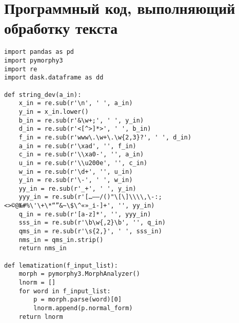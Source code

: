 \documentclass[coursework]{SCWorks}
\begin{document}
\conclusion


% 
% 

\appendix
\section{Программный код, выполняющий обработку текста}
\label{apx:tokenization}
\begin{verbatim}
import pandas as pd
import pymorphy3
import re
import dask.dataframe as dd

def string_dev(a_in):
    x_in = re.sub(r'\n', ' ', a_in)
    y_in = x_in.lower()
    b_in = re.sub(r'&\w+;', ' ', y_in)
    d_in = re.sub(r'<[^>]*>', ' ', b_in)
    f_in = re.sub(r'www\.\w+\.\w{2,3}?', ' ', d_in)
    a_in = re.sub(r'\xad', '', f_in)
    c_in = re.sub(r'\\xa0-', '', a_in)
    u_in = re.sub(r'\\u200e', '', c_in)
    w_in = re.sub(r'\d+', '', u_in)
    y_in = re.sub(r'\-', ' ', w_in)
    yy_in = re.sub(r'_+', ' ', y_in)
    yyy_in = re.sub(r'[…—–/()"\[\]\\\\,\-:;<>©@№#%\'\+\*“”&~\$\^«»_і‑]+', '', yy_in)
    q_in = re.sub(r'[a-z]*', '', yyy_in)
    sss_in = re.sub(r'\b\w{,2}\b', '', q_in)
    qms_in = re.sub(r'\s{2,}', ' ', sss_in)
    nms_in = qms_in.strip()
    return nms_in

def lematization(f_input_list):
    morph = pymorphy3.MorphAnalyzer()
    lnorm = []
    for word in f_input_list:
        p = morph.parse(word)[0]
        lnorm.append(p.normal_form)
    return lnorm


\end{verbatim}
\end{document}
